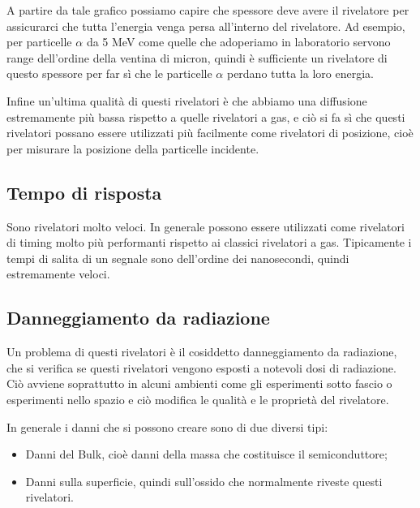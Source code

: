 \begin{esempio}
\begin{minipage}{0.63\textwidth}
      A partire da tale grafico possiamo capire che spessore deve avere il rivelatore per assicurarci che tutta l'energia venga persa all'interno del rivelatore. Ad esempio, per particelle $\alpha$ da 5 MeV come quelle che adoperiamo in laboratorio servono range dell'ordine della ventina di micron, quindi è sufficiente un rivelatore di questo spessore per far sì che le particelle $\alpha$ perdano tutta la loro energia.
   \end{minipage}
\end{esempio}

Infine un'ultima qualità di questi rivelatori è che abbiamo una diffusione estremamente più bassa rispetto a quelle rivelatori a gas, e ciò si fa sì che questi rivelatori possano essere utilizzati più facilmente come rivelatori di posizione, cioè per misurare la posizione della particelle incidente.

\subsection{Tempo di risposta}

Sono rivelatori molto veloci. In generale possono essere utilizzati come rivelatori di timing molto più performanti rispetto ai classici rivelatori a gas. Tipicamente i tempi di salita di un segnale sono dell'ordine dei nanosecondi, quindi estremamente veloci.

\subsection{Danneggiamento da radiazione}
Un problema di questi rivelatori è il cosiddetto danneggiamento da radiazione, che si verifica se questi rivelatori vengono esposti a notevoli dosi di radiazione. Ciò avviene soprattutto in alcuni ambienti come gli esperimenti sotto fascio o esperimenti nello spazio e ciò modifica le qualità e le proprietà del rivelatore.

In generale i danni che si possono creare sono di due diversi tipi:
\begin{itemize}
   \item Danni del Bulk, cioè danni della massa che costituisce il semiconduttore;
   \item Danni sulla superficie, quindi sull'ossido che normalmente riveste questi rivelatori.
\end{itemize}

